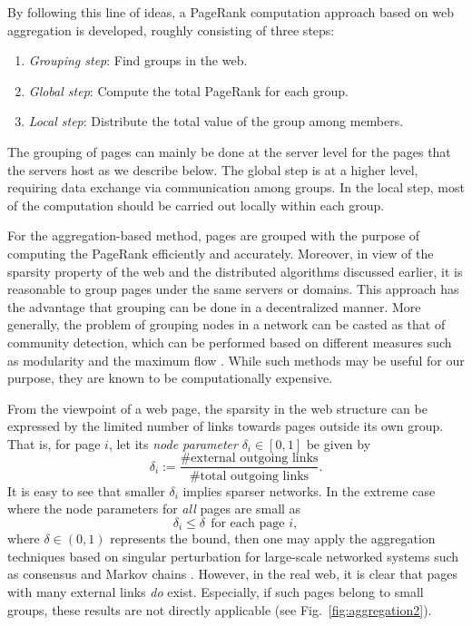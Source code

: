 \documentclass[11pt,draftcls,onecolumn]{IEEEtran}
\begin{document}
By following this line of ideas, a PageRank computation approach
based on web aggregation is developed, roughly consisting of three steps: 
\begin{enumerate}
\item[1)] \textit{Grouping step}: Find groups in the web.
\item[2)] \textit{Global step}: Compute the total PageRank for each group.
\item[3)] \textit{Local step}: Distribute the total value of the group among members.
\end{enumerate}
The grouping of pages can mainly be done at the server level for the pages that
the servers host as we describe below.
The global step is at a higher level, requiring data exchange via communication among groups. 
In the local step, most of the computation should be carried out locally
within each group. 

For the aggregation-based method, pages are grouped 
with the purpose of computing the PageRank efficiently and accurately. 
Moreover, in view of the sparsity property of the web and the distributed algorithms 
discussed earlier, 
it is reasonable to group pages under the same servers or domains. This approach
has the advantage that grouping can be done in a decentralized manner.
More generally, the problem of grouping nodes in a network can be casted
as that of community detection, which can be performed based on different
measures such as modularity \cite{Newman:06,ExpEvaBlo:11} 
and the maximum flow \cite{FlaLawGil:02}. While such methods may be useful
for our purpose, they are known to be computationally expensive.

From the viewpoint of a web page, the sparsity in the web structure can be
expressed by the limited number of links towards pages outside its own group.
That is, for page $i$, let its \textit{node parameter} $\delta_i\in[0,1]$ be given by
\begin{equation}
   \delta_i := \frac{\text{\# external outgoing links}}{\text{\# total outgoing links}}.
 \label{eqn:node_par}
\end{equation}
It is easy to see that smaller $\delta_i$ implies sparser networks. 
In the extreme case where the node parameters for \textit{all} pages are small as
\begin{equation}
   \delta_i \leq \delta~~\text{for each page $i$},
 \label{eqn:sparse_cond}
\end{equation}
where $\delta\in(0,1)$ represents the bound, 
then one may apply the aggregation techniques based on singular perturbation
for large-scale networked systems such as consensus and Markov chains
\cite{PhiKok:81,AldKha:91,BiyArc:08,ChoKok:85}.
However, in the real web, it is clear that pages with many external links
\textit{do} exist. Especially, if such pages belong to small groups, 
these results are not directly applicable (see Fig.~\ref{fig:aggregation2}).
\end{document}

